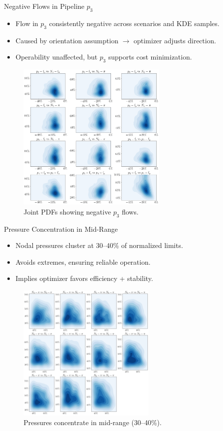 \documentclass[hyperref={colorlinks,citecolor=blue,linkcolor=blue,urlcolor=blue}]{beamer}
\begin{document}
\begin{frame}{Negative Flows in Pipeline $p_3$}
    \begin{itemize}
        \item Flow in $p_3$ consistently negative across scenarios and KDE samples.
        \item Caused by orientation assumption $\rightarrow$ optimizer adjusts direction.
        \item Operability unaffected, but $p_3$ supports cost minimization.
    \end{itemize}
    \begin{figure}
        \includegraphics[width=0.65\textwidth]{figures/outputs_outputs_2.png}
        \caption*{Joint PDFs showing negative $p_3$ flows.}
    \end{figure}
\end{frame}

\begin{frame}{Pressure Concentration in Mid-Range}
    \begin{itemize}
        \item Nodal pressures cluster at 30--40\% of normalized limits.
        \item Avoids extremes, ensuring reliable operation.
        \item Implies optimizer favors efficiency + stability.
    \end{itemize}
    \begin{figure}
        \includegraphics[width=0.6\textwidth]{figures/outputs_outputs_3.png}
        \caption*{Pressures concentrate in mid-range (30--40\%).}
    \end{figure}
\end{frame}
\end{document}
